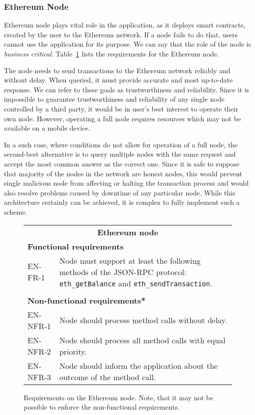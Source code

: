 \subsubsection{Ethereum Node}
Ethereum node plays vital role in the application, as it deploys smart contracts, created by the user to the Ethereum network. If a node fails to do that, users cannot use the application for its purpose. We can say that the role of the node is \textit{business critical}. Table~\ref{fig:reqs-node} lists the requirements for the Ethereum node.

The node needs to send transactions to the Ethereum network reliably and without delay. When queried, it must provide accurate and most up-to-date response. We can refer to these goals as trustworthiness and reliability. Since it is impossible to guarantee trustworthiness and reliability of any single node controlled by a third party, it would be in user’s best interest to operate their own node. However, operating a full node requires resources which may not be available on a mobile device.

In a such case, where conditions do not allow for operation of a full node, the second-best alternative is to query multiple nodes with the same request and accept the most common answer as the correct one. Since it is safe to suppose that majority of the nodes in the network are honest nodes, this would prevent single malicious node from affecting or halting the transaction process and would also resolve problems caused by downtime of any particular node. While this architecture certainly can be achieved, it is complex to fully implement such a scheme. 

\begin{figure}[ht]
    \centering
    \begin{tabularx}{\textwidth}{|l X|}
        \hline
        \multicolumn{2}{|c|}{\textbf{Ethereum node}}\\
        \multicolumn{2}{|l|}{\textbf{Functional requirements}}\\
        EN-FR-1&Node must support at least the following methods of the JSON-RPC protocol: \texttt{eth\_getBalance} and \texttt{eth\_sendTransaction}.\\
        &\\
        \multicolumn{2}{|l|}{\textbf{Non-functional requirements*}}\\
        EN-NFR-1&Node should process method calls without delay.\\
        EN-NFR-2&Node should process all method calls with equal priority.\\
        EN-NFR-3&Node should inform the application about the outcome of the method call.\\
        \hline
    \end{tabularx}
    \caption{Requirements on the Ethereum node. Note, that it may not be possible to enforce the non-functional requirements.}
    \label{fig:reqs-node}
\end{figure}

